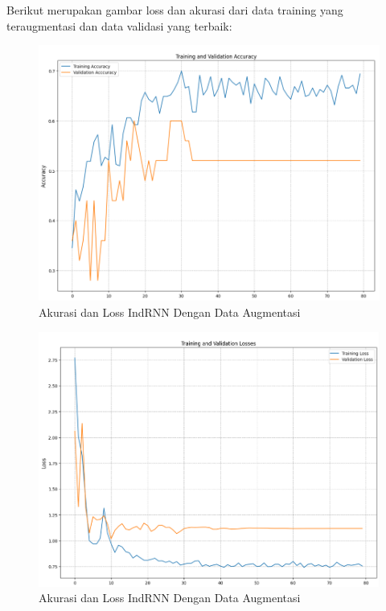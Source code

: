 \newpage
Berikut merupakan gambar loss dan akurasi dari data training yang teraugmentasi dan
data validasi yang terbaik:
\begin{figure} [ht] \centering
  \includegraphics[scale=0.55]{gambar/AccIndRNNAug.png}
  \caption{Akurasi dan Loss IndRNN Dengan Data Augmentasi}
  \label{fig:AccIndRNNaug}
\end{figure}

\begin{figure} [ht] \centering
  \includegraphics[scale=0.55]{gambar/LossIndRNNAug.png}
  \caption{Akurasi dan Loss IndRNN Dengan Data Augmentasi}
  \label{fig:LossIndRNNaug}
\end{figure}

